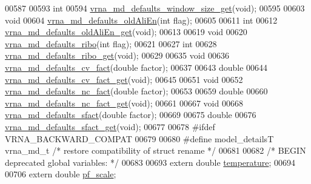 \begin{DoxyCode}
00587 
00593 \textcolor{keywordtype}{int}
00594 \hyperlink{group__model__details_ga670146a9aa3ba77f4d422d60b7c30ac9}{vrna\_md\_defaults\_window\_size\_get}(\textcolor{keywordtype}{void});
00595 
00603 \textcolor{keywordtype}{void}
00604 \hyperlink{group__model__details_ga41521d5b9fb7e0f31e7ea73f5792afab}{vrna\_md\_defaults\_oldAliEn}(\textcolor{keywordtype}{int} flag);
00605 
00611 \textcolor{keywordtype}{int}
00612 \hyperlink{group__model__details_ga2374492b5019df88022fe4c05f0f3630}{vrna\_md\_defaults\_oldAliEn\_get}(\textcolor{keywordtype}{void});
00613 
00619 \textcolor{keywordtype}{void}
00620 \hyperlink{group__model__details_ga937c45e1d06fd6168730a9b08d130be3}{vrna\_md\_defaults\_ribo}(\textcolor{keywordtype}{int} flag);
00621 
00627 \textcolor{keywordtype}{int}
00628 \hyperlink{group__model__details_ga169027f0c0561ea7d87b655e4b336bfc}{vrna\_md\_defaults\_ribo\_get}(\textcolor{keywordtype}{void});
00629 
00635 \textcolor{keywordtype}{void}
00636 \hyperlink{group__model__details_gad3a3f40baafd91a6ce80a91a68e20053}{vrna\_md\_defaults\_cv\_fact}(\textcolor{keywordtype}{double} factor);
00637 
00643 \textcolor{keywordtype}{double}
00644 \hyperlink{group__model__details_gae59c68393807217b0a2497adb64d3ee3}{vrna\_md\_defaults\_cv\_fact\_get}(\textcolor{keywordtype}{void});
00645 
00651 \textcolor{keywordtype}{void}
00652 \hyperlink{group__model__details_gac35e596c850dce3ad55c49119fd7d471}{vrna\_md\_defaults\_nc\_fact}(\textcolor{keywordtype}{double} factor);
00653 
00659 \textcolor{keywordtype}{double}
00660 \hyperlink{group__model__details_ga7ac759eaa7159bf5f022745f5da59508}{vrna\_md\_defaults\_nc\_fact\_get}(\textcolor{keywordtype}{void});
00661 
00667 \textcolor{keywordtype}{void}
00668 \hyperlink{group__model__details_ga3f73d3029d3d0025d4cc311510cd95a3}{vrna\_md\_defaults\_sfact}(\textcolor{keywordtype}{double} factor);
00669 
00675 \textcolor{keywordtype}{double}
00676 \hyperlink{group__model__details_gab2df6aab954b63fd3592d18e90285dae}{vrna\_md\_defaults\_sfact\_get}(\textcolor{keywordtype}{void});
00677 
00678 \textcolor{preprocessor}{#ifdef  VRNA\_BACKWARD\_COMPAT}
00679 
00680 \textcolor{preprocessor}{#define model\_detailsT        vrna\_md\_t               }\textcolor{comment}{/* restore compatibility of struct rename */}\textcolor{preprocessor}{}
00681 
00682 \textcolor{comment}{/* BEGIN deprecated global variables: */}
00683 
00693 \textcolor{keyword}{extern} \textcolor{keywordtype}{double} \hyperlink{group__model__details_a5f7e5c2b65bada5188443470e576aa4b}{temperature};
00694 
00706 \textcolor{keyword}{extern} \textcolor{keywordtype}{double} \hyperlink{group__model__details_gad3b22044065acc6dee0af68931b52cfd}{pf\_scale};

\end{DoxyCode}
